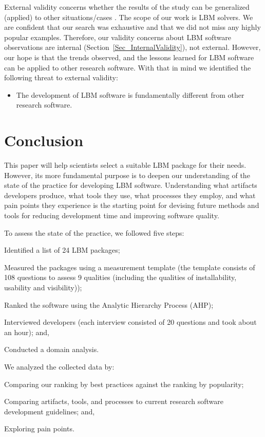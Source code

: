 \documentclass[final, 3p, times, authoryear]{elsarticle}
\begin{document}
External validity concerns whether the results of the study can be generalized
(applied) to other situations/cases \citep{AmpatzoglouEtAl2019}.  The scope of
our work is LBM solvers.  We are confident that our search was exhaustive and
that we did not miss any highly popular examples.  Therefore, our validity
concerns about LBM software observations are internal
(Section~\ref{Sec_InternalValidity}), not external.  However, our hope is that
the trends observed, and the lessons learned for LBM software can be applied to
other research software.  With that in mind we identified the following threat
to external validity:

\begin{itemize}
\item The development of LBM software is fundamentally different from other
research software.
\end{itemize}

\section{Conclusion} \label{conclusion}

This paper will help scientists select a suitable LBM package for their needs.
However, its more fundamental purpose is to deepen our understanding of the
state of the practice for developing LBM software. Understanding what artifacts
developers produce, what tools they use, what processes they employ, and what
pain points they experience is the starting point for devising future methods
and tools for reducing development time and improving software quality. 

To assess the state of the practice, we followed five steps:
\begin{inparaenum}[i)]
	\item Identified a list of 24 LBM packages;
	\item Measured the packages using a measurement template (the template
	consists of 108 questions to assess 9 qualities (including the qualities of
	installability, usability and visibility));
	\item Ranked the software using the Analytic Hierarchy Process (AHP);
	\item Interviewed developers (each interview consisted of 20 questions and took
	about an hour); and, 
	\item Conducted a domain analysis. 
\end{inparaenum}
We analyzed the collected data by: 
\begin{inparaenum}[i)]
	\item Comparing our ranking by best practices against the ranking by
	popularity;
	\item Comparing artifacts, tools, and processes to current research software
	development guidelines; and, 
	\item Exploring pain points.
\end{inparaenum}
\end{document}
